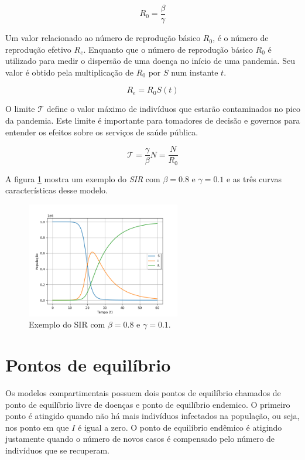 \begin{equation}\label{eq:numero-reproducao-basico}
    R_0 = \frac{\beta}{\gamma}
\end{equation}

Um valor relacionado ao número de reprodução básico $R_0$, é o número de reprodução
efetivo $R_e$. Enquanto que o número de reprodução básico $R_0$ é utilizado para
medir o dispersão de uma doença no início de uma pandemia. 
Seu valor é obtido pela multiplicação de $R_0$ por $S$ num instante $t$.

\begin{equation}\label{eq:numero-reproducao-efetivo}
    R_e = R_0 S(t)
\end{equation}

O limite $\mathcal{T}$ define o valor máximo de indivíduos que estarão contaminados
no pico da pandemia. Este limite é importante para tomadores de decisão e governos
para entender os efeitos sobre os serviços de saúde pública.

\begin{equation}
    \mathcal{T} = \frac{\gamma}{\beta}N = \frac{N}{R_0}
\end{equation}

A figura \ref{fig:exemplo-sir} mostra um exemplo do \textit{SIR} com $\beta=0.8$
e $\gamma=0.1$ e as três curvas características desse modelo.

\begin{figure}[htpb]
\centering
\includegraphics[width=0.6\textwidth]{figuras/sir-example-beta0.8-gamma0.1.png}
\caption{Exemplo do SIR com $\beta=0.8$ e $\gamma=0.1$.}
\label{fig:exemplo-sir}
\end{figure}

\section{Pontos de equilíbrio}

Os modelos compartimentais possuem dois pontos de equilíbrio chamados de 
ponto de equilíbrio livre de doenças e ponto de equilíbrio endemico. 
O primeiro ponto é atingido quando não há mais indivíduos infectados na população,
ou seja, nos ponto em que $I$ é igual a zero. O ponto de equilíbrio endêmico
é atigindo justamente quando o número de novos casos é compensado pelo número
de indivíduos que se recuperam.

